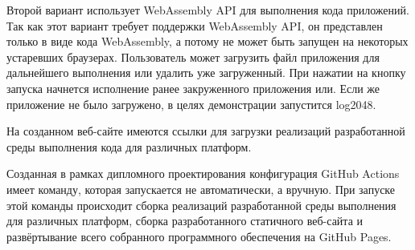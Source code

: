 Второй вариант использует WebAssembly API для выполнения кода приложений.
Так как этот вариант требует поддержки WebAssembly API, он представлен только в виде кода WebAssembly, а потому не может быть запущен на некоторых устаревших браузерах.
Пользователь может загрузить файл приложения для дальнейшего выполнения или удалить уже загруженный.
При нажатии на кнопку запуска начнется исполнение ранее закруженного приложения или. 
Если же приложение не было загружено, в целях демонстрации запустится log2048.

На созданном веб-сайте имеются ссылки для загрузки реализаций разработанной среды выполнения кода для различных платформ.

Созданная в рамках дипломного проектирования конфигурация GitHub Actions имеет команду, которая запускается не автоматически, а вручную.
При запуске этой команды происходит сборка реализаций разработанной среды выполнения для различных платформ, сборка разработанного статичного веб-сайта и развёртывание всего собранного программного обеспечения на GitHub Pages.

